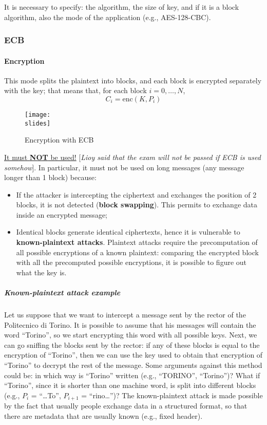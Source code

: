 It is necessary to specify:
the algorithm, the size of key, and if it is a block algorithm, also the mode of the application (e.g., AES-128-CBC).


\subsubsection{ECB}
\paragraph*{Encryption}
This mode splits the plaintext into blocks, and each block is encrypted separately with the key;
that means that, for each block \(i = 0, \ldots, N\),
\[
    C_i = \text{enc}(K, P_i)
\]
\begin{figure}[h]
    \centering
    \texttt{[image: \\slides]}
    \caption{Encryption with ECB}
\end{figure}

\underline{It must \textbf{NOT} be used!} [\textit{Lioy said that the exam will not be passed if ECB is used somehow}].
In particular, it must not be used on long messages (any message longer than 1 block) because:
\begin{itemize}
    \item If the attacker is intercepting the ciphertext and exchanges the position of 2 blocks, it is not detected (\textbf{block swapping}). This permits to exchange data inside an encrypted message;
    \item Identical blocks generate identical ciphertexts, hence it is vulnerable to \textbf{known-plaintext attacks}. Plaintext attacks require the precomputation of all possible encryptions of a known plaintext: comparing the encrypted block with all the precomputed possible encryptions, it is possible to figure out what the key is.
\end{itemize}

\subparagraph*{Known-plaintext attack example}
Let us suppose that we want to intercept a message sent by the rector of the Politecnico di Torino. It is possible
to assume that his messages will contain the word “Torino”, so we start encrypting this word with all possible
keys. Next, we can go sniffing the blocks sent by the rector: if any of these blocks is equal to the encryption
of “Torino”, then we can use the key used to obtain that encryption of “Torino” to decrypt the rest of the
message. Some arguments against this method could be: in which way is “Torino” written (e.g., “TORINO”,
“Torino”)? What if “Torino”, since it is shorter than one machine word, is split into different blocks (e.g., \(P_i\) =
“…To”, \(P_{i+1}\) = “rino…”)? The known-plaintext attack is made possible by the fact that usually people exchange
data in a structured format, so that there are metadata that are usually known (e.g., fixed header).


